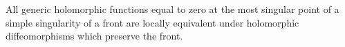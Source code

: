 All generic holomorphic functions equal to zero at the most singular point of a simple singularity of a front are locally equivalent under holomorphic diffeomorphisms which preserve the front.
